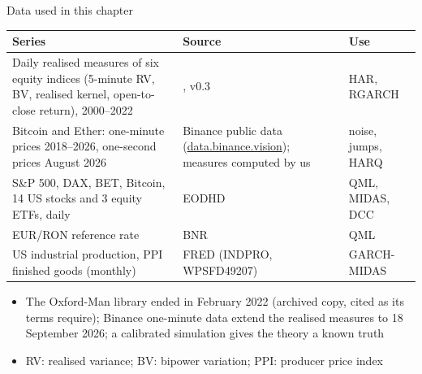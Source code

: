 \begin{frame}{Data used in this chapter}
\itemsize{\footnotesize}
\begin{center}
\scriptsize
\begin{tabular}{>{\raggedright\arraybackslash}p{4.6cm}>{\raggedright\arraybackslash}p{4.9cm}>{\raggedright\arraybackslash}p{2.4cm}}
\toprule
\textbf{Series} & \textbf{Source} & \textbf{Use} \\
\midrule
Daily realised measures of six equity indices (5-minute RV, BV, realised kernel, open-to-close return), 2000--2022 & , v0.3 & HAR, RGARCH \\
Bitcoin and Ether: one-minute prices 2018--2026, one-second prices August 2026 & Binance public data (\href{https://data.binance.vision}{data.binance.vision}); measures computed by us & noise, jumps, HARQ \\
S\&P 500, DAX, BET, Bitcoin, 14 US stocks and 3 equity ETFs, daily & EODHD & QML, MIDAS, DCC \\
EUR/RON reference rate & BNR & QML \\
US industrial production, PPI finished goods (monthly) & FRED (INDPRO, WPSFD49207) & GARCH-MIDAS \\
\bottomrule
\end{tabular}
\end{center}
\begin{itemize}
    \item The Oxford-Man library ended in February 2022 (archived copy, cited as its terms require); Binance one-minute data extend the realised measures to 18 September 2026; a calibrated simulation gives the theory a known truth
    \item RV: realised variance; BV: bipower variation; PPI: producer price index
\end{itemize}
\end{frame}

